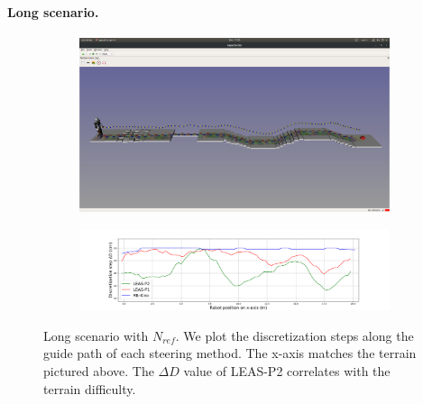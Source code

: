 \paragraph{Long scenario.}
\begin{figure}[ht]
    \centering
    \captionsetup[subfigure]{justification=centering}
    \begin{subfigure}[t]{0.9\linewidth}
        \includegraphics[trim={1cm 12cm 1cm 15cm}, clip,width=\textwidth]{Figures/Chapter_MIP_SL1M/1x11_guide_all_surf_steps.png}
    \end{subfigure}
    \begin{subfigure}[t]{0.9\linewidth}
        \includegraphics[trim={4cm 0cm 3.5cm 1.65cm}, clip,width=\textwidth]{Figures/Chapter_MIP_SL1M/res_mip/Long_discr_x_axis.png}
    \end{subfigure}
    \caption{Long scenario with $N_{ref}$. We plot the discretization steps along the guide path of each steering method. The x-axis matches the terrain pictured above. The $\Delta D$ value of LEAS-P2 correlates with the terrain difficulty.}
    \label{fig:mip:long_range}
\end{figure}

